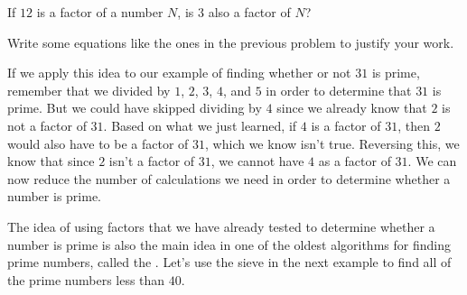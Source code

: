 \documentclass{ximera}
\begin{document}
\begin{question}
If $12$ is a factor of a number $N$, is $3$ also a factor of $N$?
\begin{multipleChoice}
\begin{feedback}
Write some equations like the ones in the previous problem to justify your work.
\end{feedback}
\end{multipleChoice}
\end{question}

If we apply this idea to our example of finding whether or not $31$ is prime, remember that we divided by $1$, $2$, $3$, $4$, and $5$ in order to determine that $31$ is prime. But we could have skipped dividing by $4$ since we already know that $2$ is not a factor of $31$. Based on what we just learned, if $4$ is a factor of $31$, then $2$ would also have to be a factor of $31$, which we know isn't true. Reversing this, we know that since $2$ isn't a factor of $31$, we cannot have $4$ as a factor of $31$. We can now reduce the number of calculations we need in order to determine whether a number is prime.

The idea of using factors that we have already tested to determine whether a number is prime is also the main idea in one of the oldest algorithms for finding prime numbers, called the . Let's use the sieve in the next example to find all of the prime numbers less than $40$.
\end{document}
